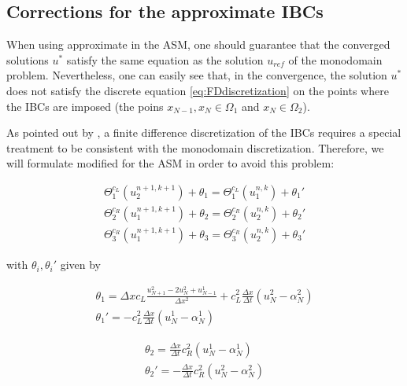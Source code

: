 \subsection{Corrections for the approximate IBCs}

\indent When using approximate  in the ASM, one should guarantee that the converged solutions $u^*$ satisfy the same equation as the solution $u_{ref}$ of the monodomain problem. Nevertheless, one can easily see that, in the convergence, the solution $u^*$ does not satisfy the discrete equation \eqref{eq:FDdiscretization} on the points where the IBCs are imposed (the poins $x_{N-1},x_N \in \Omega_1$ and $x_N \in \Omega_2$). 

\indent As pointed out by \cite{Gander2001}, a finite difference discretization of the IBCs requires a special treatment to be consistent with the monodomain discretization. Therefore, we will formulate modified   for the ASM in order to avoid this problem:

\begin{equation}
	\label{eq:correctedTBC}
    \begin{gathered}
        \Theta_1^{c_L}(u_2^{n+1,k+1}) + \theta_1 = \Theta_1^{c_L}(u_1^{n,k}) + \theta_1' \\
        \Theta_2^{c_R}(u_1^{n+1,k+1}) + \theta_2 = \Theta_2^{c_R}(u_2^{n,k}) + \theta_2' \\
        \Theta_3^{c_R}(u_1^{n+1,k+1}) + \theta_3 = \Theta_3^{c_R}(u_2^{n,k}) + \theta_3'
    \end{gathered}
\end{equation}

\noindent with $\theta_i, \theta_i'$ given by

\begin{gather*}
    \theta_1 = \Delta x c_L \frac{u_{N+1}^2 - 2u_{N}^2 + u_{N-1}^1}{\Delta x^2} + c_L^2\frac{\Delta x}{\Delta t} \left( u_{N}^2 - \alpha_{N}^2 \right)\\
    \theta_1' = - c_L^2\frac{\Delta x}{\Delta t} \left( u_{N}^1 - \alpha_{N}^1 \right)
\end{gather*}

\begin{equation*}
\begin{gathered}
    \theta_2 = \frac{\Delta x}{\Delta t} c_R^2 (u_N^1 - \alpha_N^1) \\
    \theta_2' = -\frac{\Delta x}{\Delta t} c_R^2 (u_N^2 - \alpha_N^2)
\end{gathered}
\end{equation*}

